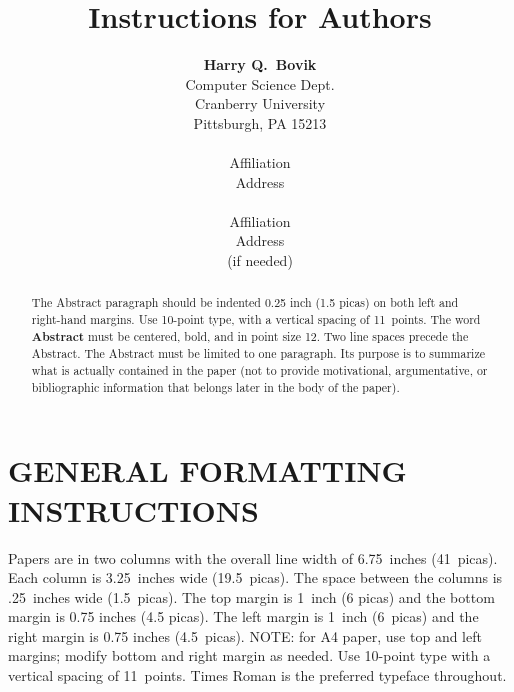 

\title{Instructions for Authors}

\author{ {\bf Harry Q.~Bovik } \\
Computer Science Dept. \\
Cranberry University\\
Pittsburgh, PA 15213 \\
  \\
Affiliation          \\
Address \\
   \\
Affiliation \\
Address    \\ (if needed)\\ }



\maketitle

\begin{abstract}
The Abstract paragraph should be indented 0.25 inch (1.5 picas) on
both left and right-hand margins.  Use  10-point type, with a vertical
spacing of 11~points.  The word {\bf Abstract} must be centered, bold,
and in point size 12. Two line spaces precede the Abstract. The
Abstract must be limited to one paragraph. Its purpose is to summarize
what is actually contained in the paper (not to provide motivational,
argumentative, or bibliographic information that belongs later in the
body of the paper).
\end{abstract}

\section{GENERAL FORMATTING INSTRUCTIONS}
Papers are in two columns with the overall line width of
6.75~inches (41~picas).   Each column is 3.25~inches wide
(19.5~picas).  The space between the columns is .25~inches wide
(1.5~picas).  The top margin is 1~inch (6 picas) and the bottom margin is
0.75 inches (4.5 picas). The left margin is 1~inch (6~picas) and the right
margin is 0.75 inches (4.5~picas). NOTE: for A4 paper, use top and
left margins; modify bottom and right margin as needed.  Use
10-point type with a vertical spacing of 11~points.   Times Roman
is the preferred typeface throughout.

